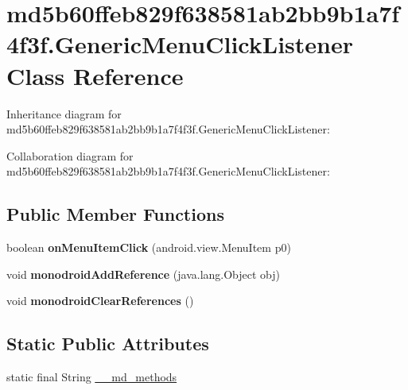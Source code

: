 \hypertarget{classmd5b60ffeb829f638581ab2bb9b1a7f4f3f_1_1_generic_menu_click_listener}{}\section{md5b60ffeb829f638581ab2bb9b1a7f4f3f.\+Generic\+Menu\+Click\+Listener Class Reference}
\label{classmd5b60ffeb829f638581ab2bb9b1a7f4f3f_1_1_generic_menu_click_listener}


Inheritance diagram for md5b60ffeb829f638581ab2bb9b1a7f4f3f.\+Generic\+Menu\+Click\+Listener\+:


Collaboration diagram for md5b60ffeb829f638581ab2bb9b1a7f4f3f.\+Generic\+Menu\+Click\+Listener\+:
\subsection*{Public Member Functions}
\begin{DoxyCompactItemize}
\item 
\mbox{\label{classmd5b60ffeb829f638581ab2bb9b1a7f4f3f_1_1_generic_menu_click_listener_a79412f7f13b9f7b52668e994eab1a66d}} 
boolean {\bfseries on\+Menu\+Item\+Click} (android.\+view.\+Menu\+Item p0)
\item 
\mbox{\label{classmd5b60ffeb829f638581ab2bb9b1a7f4f3f_1_1_generic_menu_click_listener_a789da55ae23929b66b71f9e9357ff250}} 
void {\bfseries monodroid\+Add\+Reference} (java.\+lang.\+Object obj)
\item 
\mbox{\label{classmd5b60ffeb829f638581ab2bb9b1a7f4f3f_1_1_generic_menu_click_listener_acd947cf5b70173321c638063cf1215d8}} 
void {\bfseries monodroid\+Clear\+References} ()
\end{DoxyCompactItemize}
\subsection*{Static Public Attributes}
\begin{DoxyCompactItemize}
\item 
static final String \hyperlink{classmd5b60ffeb829f638581ab2bb9b1a7f4f3f_1_1_generic_menu_click_listener_a6c9c1226d60f05dc9be14f20174fdebb}{\+\_\+\+\_\+md\+\_\+methods}
\end{DoxyCompactItemize}


